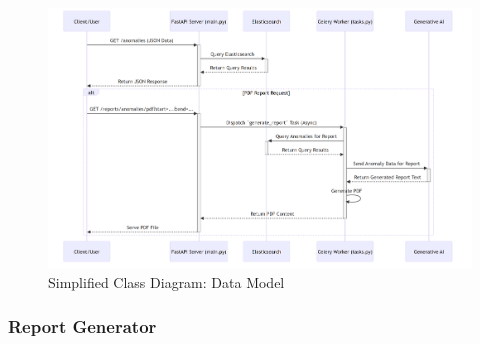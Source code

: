 
\begin{figure}[H]
    \centering
    \includegraphics[width=1.2\textwidth,angle=90]{figures/api-1.png}
    \caption{Simplified Class Diagram: Data Model}
    \label{fig:class_diagram_data_model}
\end{figure}




\subsubsection{Report Generator}

